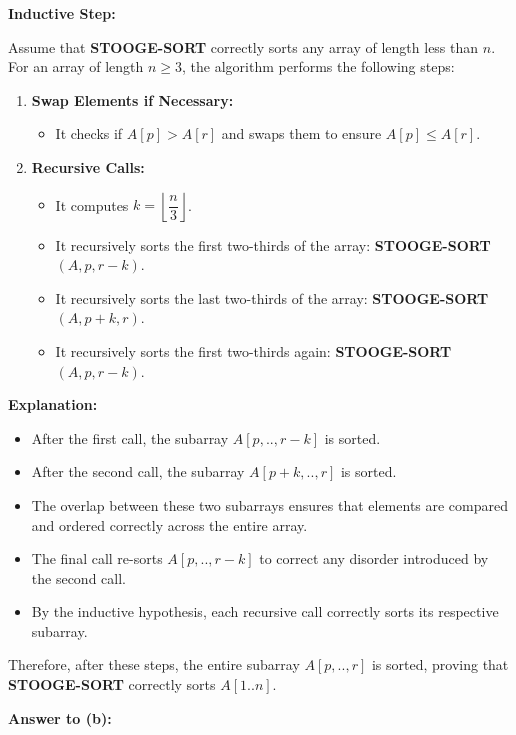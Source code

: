 \documentclass[10pt,letter,notitlepage]{article}
\begin{document}
\begin{Answer}
\textbf{Inductive Step:}

Assume that \textbf{STOOGE-SORT} correctly sorts any array of length less than $n$. For an array of length $n \geq 3$, the algorithm performs the following steps:

\begin{enumerate}
\item \textbf{Swap Elements if Necessary:}
\begin{itemize}
\item It checks if $A[p] > A[r]$ and swaps them to ensure $A[p] \leq A[r]$.
\end{itemize}
\item \textbf{Recursive Calls:}
\begin{itemize}
\item It computes $k = \left\lfloor \dfrac{n}{3} \right\rfloor$.
\item It recursively sorts the first two-thirds of the array: \textbf{STOOGE-SORT}$(A, p, r - k)$.
\item It recursively sorts the last two-thirds of the array: \textbf{STOOGE-SORT}$(A, p + k, r)$.
\item It recursively sorts the first two-thirds again: \textbf{STOOGE-SORT}$(A, p, r - k)$.
\end{itemize}
\end{enumerate}

\textbf{Explanation:}

\begin{itemize}
\item After the first call, the subarray $A[p,..,r - k]$ is sorted.
\item After the second call, the subarray $A[p + k,..,r]$ is sorted.
\item The overlap between these two subarrays ensures that elements are compared and ordered correctly across the entire array.
\item The final call re-sorts $A[p,..,r - k]$ to correct any disorder introduced by the second call.
\item By the inductive hypothesis, each recursive call correctly sorts its respective subarray.
\end{itemize}

Therefore, after these steps, the entire subarray $A[p,..,r]$ is sorted, proving that \textbf{STOOGE-SORT} correctly sorts $A[1..n]$.


\vspace{+0.5cm}

\textbf{Answer to (b):}


\end{Answer}
\end{document}
